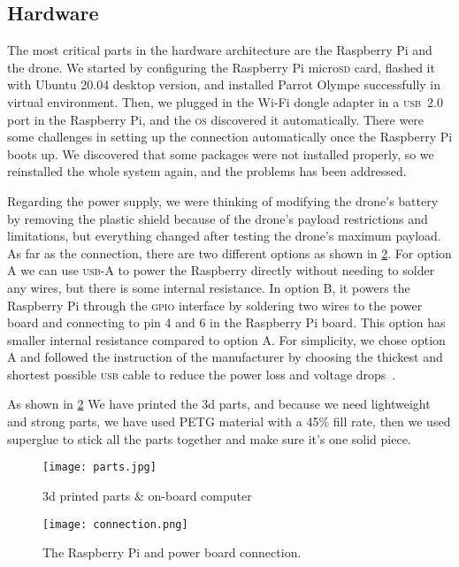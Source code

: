 \documentclass[../main.tex]{subfiles}
\begin{document}
\subsection{Hardware}

The most critical parts in the hardware
architecture are the Raspberry Pi and the drone. 
We started by configuring the Raspberry Pi micro\textsc{sd} card,
flashed it with Ubuntu 20.04 desktop version,
and installed Parrot Olympe successfully in virtual environment. 
Then, we plugged in the Wi-Fi dongle adapter
in a \textsc{usb}~2.0 port in the Raspberry Pi, 
and the \textsc{os} discovered it automatically. 
There were some challenges in setting up the connection automatically 
once the Raspberry Pi boots up. We discovered that some packages were not installed properly,
so we reinstalled the whole system again, and the problems has been addressed. 


Regarding the power supply, we were thinking 
of modifying the drone's battery by removing the 
plastic shield because of the drone's payload restrictions 
and limitations, but everything changed after testing 
the drone's maximum payload.
As far as the connection, there are 
two different options as shown in \cref{fig:connection}.
For option A we can use \textsc{usb}-A to power the Raspberry directly 
without needing to solder any wires, but there is some internal resistance.
In option B, it powers the Raspberry Pi through the \textsc{gpio} 
interface by soldering two wires to the power board and 
connecting to pin 4 and 6 in the Raspberry Pi board.
This option has smaller internal resistance compared to option A.
For simplicity, we chose option A and   
followed the instruction of the manufacturer by choosing 
the thickest and shortest possible \textsc{usb} cable to reduce 
the power loss and voltage drops~\cite{makerfocus}.

As shown in \cref{fig:connection} We have printed the 3d 
parts, and because we need lightweight and strong parts, 
we have used PETG material with a 45\% fill rate, 
then we used superglue to stick all the parts together 
and make sure it's one solid piece.

\begin{figure}[p]
	\centering
	\texttt{[image: parts.jpg]}
	\caption{3d printed parts \& on-board computer}
	\label{fig:printed-parts}
\end{figure} 

\begin{figure}[p]
	\centering
	\texttt{[image: connection.png]}
	\caption{The Raspberry Pi and power board connection.}
	\label{fig:connection}
\end{figure}  
\end{document}
